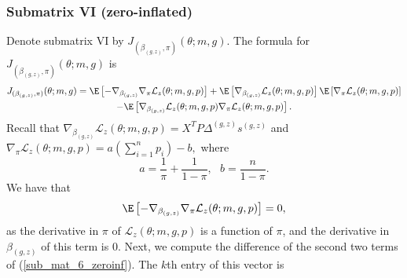 \documentclass[11pt]{article}
\begin{document}
\begin{appendices}
\begin{refsection}
\subsubsection*{Submatrix VI (zero-inflated)}
Denote submatrix VI by $J_{(\beta_{(g,z)},\pi)}(\theta; m, g).$ The formula for $J_{(\beta_{(g,z)},\pi)}(\theta; m, g)$ is
\begin{multline}\label{sub_mat_6_zeroinf}
J_{(\beta_{(g,z)},\pi)}(\theta; m, g) = \E \left[-\nabla_{\beta_{(g,z)}} \nabla_{\pi} \mathcal{L}_z(\theta; m, g, p) \right] + \E\left[ \nabla_{\beta_{(g,z)}}\mathcal{L}_z(\theta; m, g ,p)\right] \E \left[ \nabla_{\pi}\mathcal{L}_z(\theta; m,g,p) \right] \\ - \E \left[ \nabla_{\beta_{(g,z)}}\mathcal{L}_z(\theta; m,g,p) \nabla_{\pi}\mathcal{L}_z(\theta; m,g,p) \right].
\end{multline} Recall that $\nabla_{\beta_{(g,z)}} \mathcal{L}_z(\theta; m, g, p) = X^T P \Delta^{(g,z)}s^{(g,z)}$ and $\nabla_\pi \mathcal{L}_z(\theta; m, g, p) = a \left(\sum_{i=1}^n p_i\right) - b,$ where $$a = \frac{1}{\pi} + \frac{1}{1 - \pi}, \textrm{    } b = \frac{n}{1 - \pi}.$$ 
We have that
\begin{equation}\label{sub_mat_6_zeroinf_1}
\E \left[-\nabla_{\beta_{(g,z)}} \nabla_{\pi} \mathcal{L}_z(\theta; m, g, p) \right] = 0,
\end{equation}
as the derivative in $\pi$ of $\mathcal{L}_z(\theta; m, g, p)$ is a function of $\pi$, and the derivative in $\beta_{(g,z)}$ of this term is $0$. Next, we compute the difference of the second two terms of (\ref{sub_mat_6_zeroinf}). The $k$th entry of this vector is
\begin{multline}\label{sub_mat_6_zeroinf_2}

\end{multline}
\end{refsection}
\end{appendices}
\end{document}
